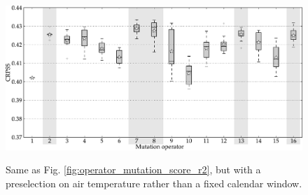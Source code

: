 \documentclass{ametsoc}
\begin{document}
\begin{figure}[t]
	\begin{center}
		\noindent\includegraphics[width=33pc,angle=0]{fig10.pdf}\\
	\end{center}
	\caption{Same as Fig. \ref{fig:operator_mutation_score_r2}, but with a preselection on air temperature rather than a fixed calendar window.}
	\label{fig:operator_mutation_score_r4}
\end{figure}
\end{document}
